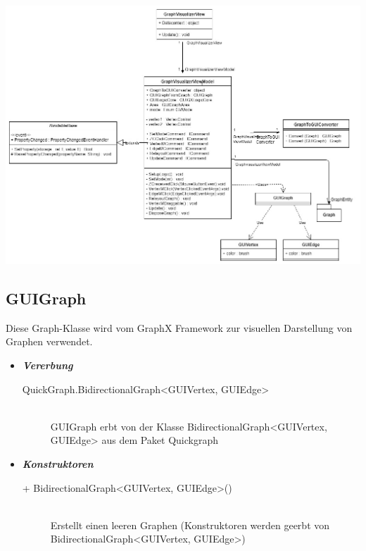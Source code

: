\documentclass[13pt]{scrreprt}
\begin{document}
	\includegraphics[scale=0.5,center]{GraphXModule.jpg}
	\newpage
	\subsection{GUIGraph}
	Diese Graph-Klasse wird vom GraphX Framework zur visuellen Darstellung von Graphen verwendet.
	\begin{itemize}[label = {$\circ$}]
		\item {\large \textbf{\textit{Vererbung}}\par}
		\begin{description}
			\item [QuickGraph.BidirectionalGraph<GUIVertex, GUIEdge>] \hfill \\ GUIGraph erbt von der Klasse BidirectionalGraph<GUIVertex, GUIEdge> aus dem Paket Quickgraph
		\end{description}
		\item {\large \textbf{\textit{Konstruktoren}}\par}
		\begin{description}
			\item [+ BidirectionalGraph<GUIVertex, GUIEdge>()] \hfill \\ Erstellt einen leeren Graphen (Konstruktoren werden geerbt von BidirectionalGraph<GUIVertex, GUIEdge>)
		\end{description}
	\end{itemize}
	
\end{document}
